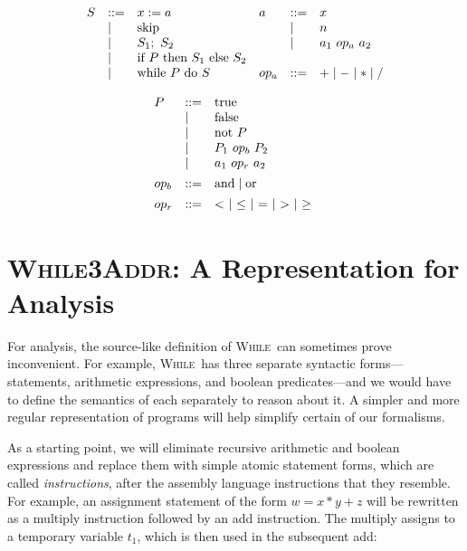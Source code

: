 \documentclass[11pt]{article}
\def\While{\textsc{While}}
\begin{document}
\[
\begin{array}{llllll}
S & ::= & x := a & a & ::= & x \\
  & \mathrel{\mid} & \mbox{skip} & & \mathrel{\mid} & n \\
  & \mathrel{\mid} & S_1;~ S_2 &  & \mathrel{\mid} & a_1 ~op_a~ a_2 \\
  & \mathrel{\mid} & \mbox{if}~ P ~\mbox{then}~ S_1 ~\mbox{else}~ S_2 \\
  & \mathrel{\mid} & \mbox{while}~ P ~\mbox{do}~ S & op_a & ::= & + \mathrel{\mid} - \mathrel{\mid} * \mathrel{\mid} /\\[1ex]
\end{array}
\]
\[
\begin{array}{lll}

P & ::= & \mbox{true} \\
  & \mathrel{\mid} & \mbox{false} \\
  & \mathrel{\mid} & \mbox{not}~ P \\
  & \mathrel{\mid} & P_1 ~op_b~ P_2 \\
  & \mathrel{\mid} & a_1 ~op_r~ a_2 \\[1ex]

op_b & ::= & \mbox{and} \mathrel{\mid} \mbox{or} \\[1ex]

op_r & ::= & <~ \mathrel{\mid} ~\le~ \mathrel{\mid} ~=~ \mathrel{\mid} ~>~ \mathrel{\mid} ~\ge~

\end{array}
\]


\section{\textsc{While3Addr}: A Representation for Analysis}

For analysis, the
source-like definition of \While~can sometimes prove inconvenient.  For example,
\While~has three separate syntactic forms---statements, arithmetic
expressions, and boolean predicates---and we would have to define the semantics
of each separately to reason about it.  A simpler and more regular representation of programs will
help simplify certain of our formalisms.

As a starting point, we will eliminate recursive arithmetic and boolean
expressions and replace them with simple atomic statement forms, which are
called \textit{instructions}, after the assembly language instructions that they
resemble.  For example, an assignment statement of the form $w = x*y+z$ will be
rewritten as a multiply instruction followed by an add instruction.  The
multiply assigns to a temporary variable $t_1$, which is then used in the
subsequent add:
\end{document}
